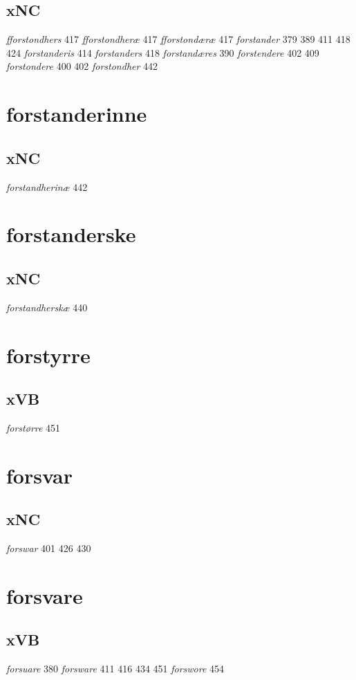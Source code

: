 \documentclass[a4paper,twocolumn]{article}
\begin{document}
\subsection{xNC}
\label{sec:org0b2c749}
\emph{fforstondhers} 417 \emph{fforstondheræ} 417 \emph{fforstondæræ} 417 \emph{forstander} 379 389 411 418 424 \emph{forstanderis} 414 \emph{forstanders} 418 \emph{forstandæres} 390 \emph{forstendere} 402 409 \emph{forstondere} 400 402 \emph{forstondher} 442 
\section{forstanderinne}
\label{sec:org95485cd}
\subsection{xNC}
\label{sec:org6a75904}
\emph{forstandherinæ} 442 
\section{forstanderske}
\label{sec:org98294a3}
\subsection{xNC}
\label{sec:org1f8148e}
\emph{forstandherskæ} 440 
\section{forstyrre}
\label{sec:orga3a189f}
\subsection{xVB}
\label{sec:org90a0f87}
\emph{forstørre} 451 
\section{forsvar}
\label{sec:org8ba085b}
\subsection{xNC}
\label{sec:orgdbc722e}
\emph{forswar} 401 426 430 
\section{forsvare}
\label{sec:org6d7804c}
\subsection{xVB}
\label{sec:org854d09a}
\emph{forsuare} 380 \emph{forsware} 411 416 434 451 \emph{forswore} 454 
\end{document}
